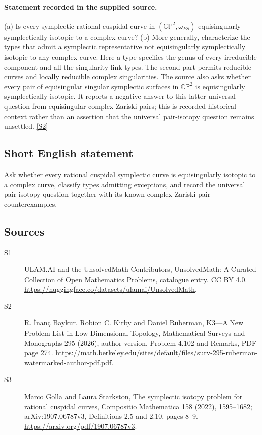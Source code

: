 \documentclass[11pt]{article}
\newcommand{\sref}[2]{\hyperlink{source:#1:#2}{[S#2]}}
\begin{document}
\paragraph{Statement recorded in the supplied source.}
(a) Is every symplectic rational cuspidal curve in $(\mathbb{CP}^2,\omega_{FS})$ equisingularly symplectically isotopic to a complex curve? (b) More generally, characterize the types that admit a symplectic representative not equisingularly symplectically isotopic to any complex curve. Here a type specifies the genus of every irreducible component and all the singularity link types. The second part permits reducible curves and locally reducible complex singularities. The source also asks whether every pair of equisingular singular symplectic surfaces in $\mathbb{CP}^2$ is equisingularly symplectically isotopic. It reports a negative answer to this latter universal question from equisingular complex Zariski pairs; this is recorded historical context rather than an assertion that the universal pair-isotopy question remains unsettled. \sref{statement}{2}
\subsection{Short English statement}
Ask whether every rational cuspidal symplectic curve is equisingularly isotopic to a complex curve, classify types admitting exceptions, and record the universal pair-isotopy question together with its known complex Zariski-pair counterexamples.
\subsection{Sources}
\begin{description}
\item[\hypertarget{source:statement:1}{S1}] ULAM.AI and the UnsolvedMath Contributors, UnsolvedMath: A Curated Collection of Open Mathematics Problems, catalogue entry. CC BY 4.0. \url{https://huggingface.co/datasets/ulamai/UnsolvedMath}.
\item[\hypertarget{source:statement:2}{S2}] R. İnanç Baykur, Robion C. Kirby and Daniel Ruberman, K3—A New Problem List in Low-Dimensional Topology, Mathematical Surveys and Monographs 295 (2026), author version, Problem 4.102 and Remarks, PDF page 274. \url{https://math.berkeley.edu/sites/default/files/surv-295-ruberman-watermarked-author-pdf.pdf}.
\item[\hypertarget{source:statement:3}{S3}] Marco Golla and Laura Starkston, The symplectic isotopy problem for rational cuspidal curves, Compositio Mathematica 158 (2022), 1595--1682; arXiv:1907.06787v3, Definitions 2.5 and 2.10, pages 8--9. \url{https://arxiv.org/pdf/1907.06787v3}.
\end{description}
\label{end:statement}
\end{document}
